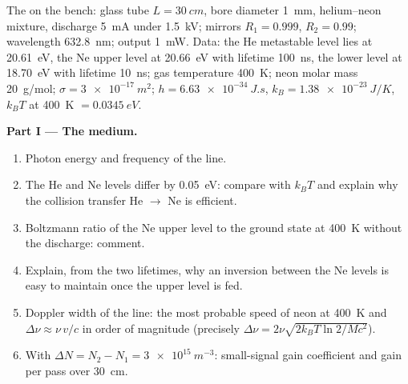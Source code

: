 \begin{problem}\label{pb:b2:laser:1}
The  on the bench: glass tube $L = \qty{30}{cm}$, bore diameter
\qty{1}{mm}, helium--neon mixture, discharge \qty{5}{mA} under
\qty{1.5}{kV}; mirrors $R_1 = 0.999$, $R_2 = 0.99$; wavelength
\qty{632.8}{nm}; output \qty{1}{mW}. Data: the He metastable level lies
at \qty{20.61}{eV}, the Ne upper  level at \qty{20.66}{eV} with
lifetime \qty{100}{ns}, the lower  level at \qty{18.70}{eV} with
lifetime \qty{10}{ns}; gas temperature \qty{400}{K}; neon molar mass
\qty{20}{g/mol};  $\sigma = \qty{3e-17}{m^2}$; $h =
\qty{6.63e-34}{J.s}$, $k_B = \qty{1.38e-23}{J/K}$, $k_BT$ at \qty{400}{K}
$= \qty{0.0345}{eV}$.

\textbf{Part I --- The medium.}
\begin{enumerate}
  \item Photon energy and frequency of the  line.
  \item The He and Ne levels differ by \qty{0.05}{eV}: compare with
        $k_BT$ and explain why the collision transfer He $\to$ Ne is
        efficient.
  \item Boltzmann ratio of the Ne upper level to the ground state at
        \qty{400}{K} without the discharge: comment.
  \item Explain, from the two lifetimes, why an inversion between the
        Ne levels is easy to maintain once the upper level is fed.
  \item Doppler width of the line: the most probable speed of neon at
        \qty{400}{K} and $\Delta\nu \approx \nu\,v/c$ in order of
        magnitude (precisely $\Delta\nu = 2\nu\sqrt{2k_BT\ln2/Mc^2}$).
  \item With $\Delta N = N_2 - N_1 = \qty{3e15}{m^{-3}}$: small-signal
        gain coefficient and gain per pass over \qty{30}{cm}.
\end{enumerate}


\end{problem}
